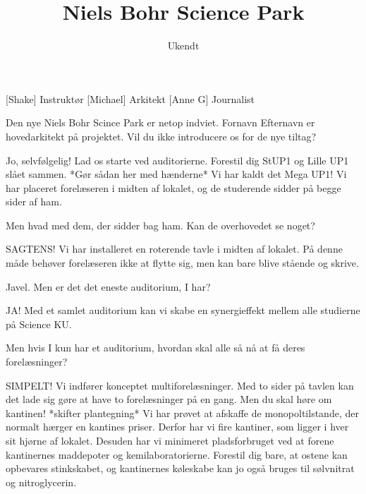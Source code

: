 \documentclass[a4paper,11pt]{article}
\title{Niels Bohr Science Park}
\author{Ukendt}
\begin{document}
\maketitle

\begin{roles}
[Shake] Instruktør
[Michael] Arkitekt
[Anne G] Journalist
\end{roles}


\begin{sketch}


 Den nye Niels Bohr Scince Park er netop indviet. Fornavn Efternavn er hovedarkitekt på projektet. Vil du ikke introducere os for de nye tiltag?

 Jo, selvfølgelig! Lad os starte ved auditorierne. Forestil dig StUP1 og Lille UP1 slået sammen. *Gør sådan her med hænderne* Vi har kaldt det Mega UP1! Vi har placeret forelæseren i midten af lokalet, og de studerende sidder på begge sider af ham.

 Men hvad med dem, der sidder bag ham. Kan de overhovedet se noget?

 SAGTENS! Vi har installeret en roterende tavle i midten af lokalet. På denne måde behøver forelæseren ikke at flytte sig, men kan bare blive stående og skrive.

 Javel. Men er det det eneste auditorium, I har?

 JA! Med et samlet auditorium kan vi skabe en synergieffekt mellem alle studierne på Science KU.

 Men hvis I kun har et auditorium, hvordan skal alle så nå at få deres forelæsninger?

 SIMPELT! Vi indfører konceptet multiforelæsninger. Med to sider på tavlen kan det lade sig gøre at have to forelæsninger på en gang. Men du skal høre om kantinen! *skifter plantegning* Vi har prøvet at afskaffe de monopoltilstande, der normalt hærger en kantines priser. Derfor har vi fire kantiner, som ligger i hver sit hjørne af lokalet. Desuden har vi minimeret pladsforbruget ved at forene kantinernes maddepoter og kemilaboratorierne. Forestil dig bare, at ostene kan opbevares stinkskabet, og kantinernes køleskabe kan jo også bruges til sølvnitrat og nitroglycerin.


\end{sketch}
\end{document}
